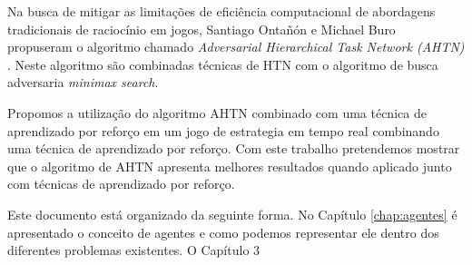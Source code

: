 Na busca de mitigar as limitações de eficiência computacional de abordagens tradicionais de raciocínio em jogos, Santiago Ontañón e Michael Buro propuseram o algoritmo chamado \textit{Adversarial Hierarchical Task Network (AHTN)} \cite{ontanon2015adversarial}. Neste algoritmo são combinadas técnicas de HTN com o algoritmo de busca adversaria \textit{minimax search}. 

Propomos a utilização do algoritmo AHTN combinado com uma técnica de aprendizado por reforço em um jogo de estrategia em tempo real combinando uma técnica de aprendizado por reforço. Com este trabalho pretendemos mostrar que o algoritmo de AHTN apresenta melhores resultados quando aplicado junto com técnicas de aprendizado por reforço.

Este documento está organizado da seguinte forma. No Capítulo \ref{chap:agentes} é apresentado o conceito de agentes e como podemos representar ele dentro dos diferentes problemas existentes. O Capítulo 3
